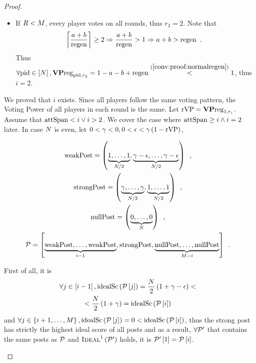 \begin{proof}
\begin{itemize}
\begin{itemize}
      \item If $R < M$, every player votes on all rounds, thus $r_2
      = 2$. Note that
      \begin{equation}
        \label{conv:proof:normalregen}
        \ceil*{\frac{a + b}{\regen}} \geq 2 \Rightarrow \frac{a + b}{\regen} >
        1 \Rightarrow a + b > \regen\enspace.
      \end{equation}
      Thus $\forall \mathrm{pid} \in \left[N\right], \mathrm{\textbf{VP}reg}_{\mathrm{pid}, r_2}
      = 1 - a - b + \mathrm{regen} \overset{(\ref{conv:proof:normalregen})}{<} 1$, thus
      $i = 2$.
    \end{itemize}
    We proved that $i$ exists. Since all players follow the same voting pattern,
    the Voting Power of all players in each round is the same. Let $\mathrm{rVP} =
    \mathrm{\textbf{VP}reg}_{1, r_i}$. Assume that $\mathrm{attSpan} < i \vee i > 2$. We
    cover the case where $\mathrm{attSpan} \geq i \wedge i = 2$ later. In case
    $N$ is even, let $0 < \gamma < 0, 0 < \epsilon < \gamma\left(1 -
    \mathrm{rVP}\right)$,

    \begin{gather*}
      \mathrm{weakPost} = \left(\underbrace{1, \dots, 1}_{N/2},
      \underbrace{\gamma - \epsilon, \dots, \gamma -
      \epsilon}_{N/2}\right) \enspace, \\
      \mathrm{strongPost} = \left(\underbrace{\gamma, \dots, \gamma}_{N/2},
      \underbrace{1, \dots, 1}_{N/2}\right) \enspace, \\
      \mathrm{nullPost} = \left(\underbrace{0, \dots, 0}_{N}\right) \enspace,
      \\
      \mathcal{P} = \left[\underbrace{\mathrm{weakPost}, \dots, \mathrm{weakPost}}_{i - 1},
      \mathrm{strongPost}, \underbrace{\mathrm{nullPost}, \dots, \mathrm{nullPost}}_{M -
      i}\right] \enspace.
    \end{gather*}

    First of all, it is
    \begin{gather*}
      \forall j \in \left[i - 1\right], \mathrm{idealSc}\left(\mathcal{P}\left[j\right]\right) =
      \frac{N}{2}\left(1 + \gamma - \epsilon\right) < \\
      < \frac{N}{2}\left(1 + \gamma\right) =
      \mathrm{idealSc}\left(\mathcal{P}\left[i\right]\right)
    \end{gather*}
    and $\forall j \in \left\{i + 1, \dots,
    M\right\}, \mathrm{idealSc}\left(\mathcal{P}\left[j\right]\right) = 0 <
    \mathrm{idealSc}\left(\mathcal{P}\left[i\right]\right)$, thus the strong post has strictly the
    highest ideal score of all posts and as a result, $\forall \mathcal{P}'$ that
    contains the same posts as $\mathcal{P}$ and
    $\textsc{Ideal}^1\left(\mathcal{P}'\right)$ holds, it is
    $\mathcal{P}'\left[1\right] = \mathcal{P}\left[i\right]$.


\end{itemize}
\end{proof}
